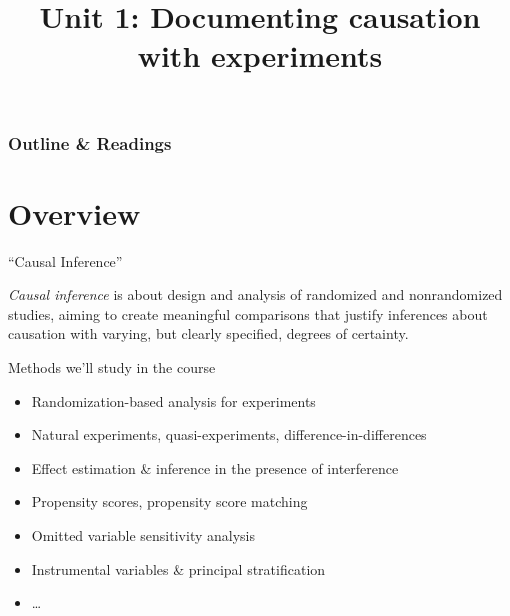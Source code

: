 %

%

%





\title{Unit 1: Documenting causation with experiments}




  \begin{frame}
    \frametitle{Outline \& Readings}

\tableofcontents[subsectionstyle=show/hide/hide]

\end{frame}

\itnote{
\item 
}

\section{Overview}

\begin{frame}{``Causal Inference''}

 \textit{Causal inference} is about design and analysis of randomized and nonrandomized studies, aiming to create meaningful comparisons that justify inferences about causation with varying, but clearly specified, degrees of certainty.  
\pause

\end{frame}

\begin{frame}[label=whatWeWillCoverFr]{Methods we'll study in the course}
  \begin{itemize}
  \item Randomization-based analysis for experiments
  \item Natural experiments, quasi-experiments,
    difference-in-differences
  \item Effect estimation \& inference in the presence of interference 
  \item Propensity scores, propensity score matching
  \item Omitted variable sensitivity analysis
  \item Instrumental variables \& principal stratification
  \item \ldots
  \end{itemize}
\end{frame}

